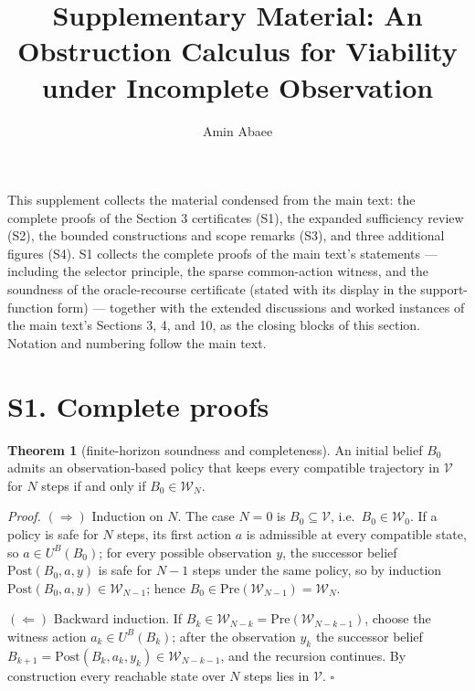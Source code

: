\documentclass[11pt]{article}
\theoremstyle{definition}
\newtheorem{theorem}{Theorem}
\begin{document}
\title{Supplementary Material: An Obstruction Calculus for Viability under Incomplete Observation}
\author{Amin Abaee}
\maketitle

This supplement collects the material condensed from the main text: the complete proofs of the Section 3 certificates (S1), the expanded sufficiency review (S2), the bounded constructions and scope remarks (S3), and three additional figures (S4). S1 collects the complete proofs of the main text's statements --- including the selector principle, the sparse common-action witness, and the soundness of the oracle-recourse certificate (stated with its display in the support-function form) --- together with the extended discussions and worked instances of the main text's Sections 3, 4, and 10, as the closing blocks of this section. Notation and numbering follow the main text.

\section*{S1. Complete proofs}

\begin{theorem}[finite-horizon soundness and completeness]\label{thm:finite-horizon}
An initial belief \(B_0\) admits an observation-based policy that keeps
every compatible trajectory in \(\mathcal V\) for \(N\) steps if and only
if \(B_0\in\mathcal W_N\).
\end{theorem}

\emph{Proof.} \((\Rightarrow)\) Induction on \(N\). The case \(N=0\) is
\(B_0\subseteq\mathcal V\), i.e.\ \(B_0\in\mathcal W_0\). If a policy is
safe for \(N\) steps, its first action \(a\) is admissible at every
compatible state, so \(a\in U^B(B_0)\); for every possible observation
\(y\), the successor belief \(\mathrm{Post}(B_0,a,y)\) is safe for \(N-1\)
steps under the same policy, so by induction
\(\mathrm{Post}(B_0,a,y)\in\mathcal W_{N-1}\); hence
\(B_0\in\mathrm{Pre}(\mathcal W_{N-1})=\mathcal W_N\).

\((\Leftarrow)\) Backward induction. If \(B_k\in\mathcal W_{N-k} =
\mathrm{Pre}(\mathcal W_{N-k-1})\), choose the witness action
\(a_k\in U^B(B_k)\); after the observation \(y_k\) the successor belief
\(B_{k+1}=\mathrm{Post}(B_k,a_k,y_k)\in\mathcal W_{N-k-1}\), and the
recursion continues. By construction every reachable state over \(N\)
steps lies in \(\mathcal V\). \ensuremath{\square}
\end{document}
